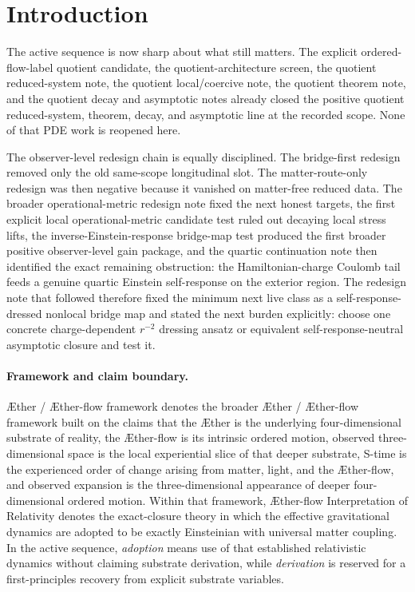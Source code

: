\documentclass[11pt]{article}
\newcommand{\Aether}{\AE{}ther}
\newcommand{\Aflow}{\AE{}ther-flow}
\newcommand{\TheoryName}{\Aflow{} Interpretation of Relativity}
\newcommand{\TheoryProgram}{\Aether{} / \Aflow{} framework}
\begin{document}
\section{Introduction}

The active sequence is now sharp about what still matters. The explicit ordered-flow-label quotient candidate, the quotient-architecture screen, the quotient reduced-system note, the quotient local/coercive note, the quotient theorem note, and the quotient decay and asymptotic notes already closed the positive quotient reduced-system, theorem, decay, and asymptotic line at the recorded scope. None of that PDE work is reopened here.

The observer-level redesign chain is equally disciplined. The bridge-first redesign removed only the old same-scope longitudinal slot. The matter-route-only redesign was then negative because it vanished on matter-free reduced data. The broader operational-metric redesign note fixed the next honest targets, the first explicit local operational-metric candidate test ruled out decaying local stress lifts, the inverse-Einstein-response bridge-map test produced the first broader positive observer-level gain package, and the quartic continuation note then identified the exact remaining obstruction: the Hamiltonian-charge Coulomb tail feeds a genuine quartic Einstein self-response on the exterior region. The redesign note that followed therefore fixed the minimum next live class as a self-response-dressed nonlocal bridge map and stated the next burden explicitly: choose one concrete charge-dependent \(r^{-2}\) dressing ansatz or equivalent self-response-neutral asymptotic closure and test it.

\paragraph{Framework and claim boundary.}
\TheoryProgram{} denotes the broader \Aether{} / \Aflow{} framework built on the claims that the \Aether{} is the underlying four-dimensional substrate of reality, the \Aflow{} is its intrinsic ordered motion, observed three-dimensional space is the local experiential slice of that deeper substrate, S-time is the experienced order of change arising from matter, light, and the \Aflow{}, and observed expansion is the three-dimensional appearance of deeper four-dimensional ordered motion. Within that framework, \TheoryName{} denotes the exact-closure theory in which the effective gravitational dynamics are adopted to be exactly Einsteinian with universal matter coupling. In the active sequence, \emph{adoption} means use of that established relativistic dynamics without claiming substrate derivation, while \emph{derivation} is reserved for a first-principles recovery from explicit substrate variables.
\end{document}
